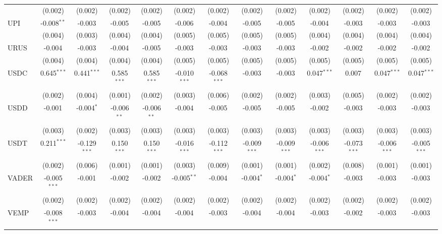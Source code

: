 \begin{table}[!htbp]
\begin{tabular}{@{\extracolsep{5pt}}lcccccccccccc}
  & (0.002) & (0.002) & (0.002) & (0.002) & (0.002) & (0.002) & (0.002) & (0.002) & (0.002) & (0.002) & (0.002) & (0.002) \\
 UPI & -0.008$^{**}$ & -0.003$^{}$ & -0.005$^{}$ & -0.005$^{}$ & -0.006$^{}$ & -0.004$^{}$ & -0.005$^{}$ & -0.005$^{}$ & -0.004$^{}$ & -0.003$^{}$ & -0.003$^{}$ & -0.003$^{}$ \\
  & (0.004) & (0.003) & (0.004) & (0.004) & (0.005) & (0.005) & (0.005) & (0.005) & (0.004) & (0.004) & (0.004) & (0.004) \\
 URUS & -0.004$^{}$ & -0.003$^{}$ & -0.004$^{}$ & -0.005$^{}$ & -0.003$^{}$ & -0.003$^{}$ & -0.003$^{}$ & -0.003$^{}$ & -0.002$^{}$ & -0.002$^{}$ & -0.002$^{}$ & -0.002$^{}$ \\
  & (0.004) & (0.004) & (0.004) & (0.004) & (0.005) & (0.005) & (0.005) & (0.005) & (0.005) & (0.005) & (0.005) & (0.005) \\
 USDC & 0.645$^{***}$ & 0.441$^{***}$ & 0.585$^{***}$ & 0.585$^{***}$ & -0.010$^{***}$ & -0.068$^{***}$ & -0.003$^{}$ & -0.003$^{}$ & 0.047$^{***}$ & 0.007$^{}$ & 0.047$^{***}$ & 0.047$^{***}$ \\
  & (0.002) & (0.004) & (0.001) & (0.002) & (0.003) & (0.006) & (0.002) & (0.002) & (0.003) & (0.005) & (0.002) & (0.002) \\
 USDD & -0.001$^{}$ & -0.004$^{*}$ & -0.006$^{**}$ & -0.006$^{**}$ & -0.004$^{}$ & -0.005$^{}$ & -0.005$^{}$ & -0.005$^{}$ & -0.002$^{}$ & -0.003$^{}$ & -0.003$^{}$ & -0.003$^{}$ \\
  & (0.003) & (0.002) & (0.003) & (0.003) & (0.003) & (0.003) & (0.003) & (0.003) & (0.003) & (0.003) & (0.003) & (0.003) \\
 USDT & 0.211$^{***}$ & -0.129$^{***}$ & 0.150$^{***}$ & 0.150$^{***}$ & -0.016$^{***}$ & -0.112$^{***}$ & -0.009$^{***}$ & -0.009$^{***}$ & -0.006$^{***}$ & -0.073$^{***}$ & -0.006$^{***}$ & -0.005$^{***}$ \\
  & (0.002) & (0.006) & (0.001) & (0.001) & (0.003) & (0.009) & (0.001) & (0.001) & (0.002) & (0.008) & (0.001) & (0.001) \\
 VADER & -0.005$^{***}$ & -0.001$^{}$ & -0.002$^{}$ & -0.002$^{}$ & -0.005$^{**}$ & -0.004$^{}$ & -0.004$^{*}$ & -0.004$^{*}$ & -0.004$^{*}$ & -0.003$^{}$ & -0.003$^{}$ & -0.003$^{}$ \\
  & (0.002) & (0.002) & (0.002) & (0.002) & (0.002) & (0.002) & (0.002) & (0.002) & (0.002) & (0.002) & (0.002) & (0.002) \\
 VEMP & -0.008$^{***}$ & -0.003$^{}$ & -0.004$^{}$ & -0.004$^{}$ & -0.004$^{}$ & -0.003$^{}$ & -0.004$^{}$ & -0.004$^{}$ & -0.003$^{}$ & -0.002$^{}$ & -0.003$^{}$ & -0.003$^{}$ \\

\end{tabular}
\end{table}
